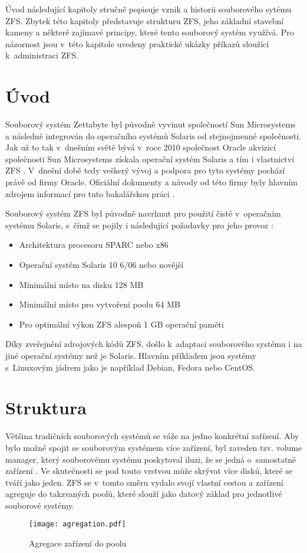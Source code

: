 Úvod následující kapitoly stručně popisuje vznik a historii souborového sytému ZFS. Zbytek této kapitoly představuje strukturu ZFS, jeho základní stavební kameny a některé zajímavé principy, které tento souborový systém využívá. Pro názornost jsou v~této kapitole uvedeny praktické ukázky příkazů sloužící k~administraci ZFS.

\section{Úvod}
    Souborový systém Zettabyte byl původně vyvinut společností Sun Microsystems a následně integrován do operačního systémů Solaris od stejnojmenné společnosti.
    Jak už to tak v~dnešním světě bývá v~roce 2010 společnost Oracle akvizicí společnosti Sun Microsystems získala operační systém Solaris a tím i vlastnictví ZFS \cite{suns}. V~dnešní době tedy veškerý vývoj a podpora pro tyto systémy pochází právě od firmy Oracle. Oficiální dokumenty a návody od této firmy byly hlavním zdrojem informací pro tuto bakalářskou práci \cite{guide}.

    Souborový systém ZFS byl původně navrhnut pro použití čistě v~operačním systému Solaris, s~čímž se pojily i následující požadavky pro jeho provoz \cite{requirements}:
    \begin{itemize}
      \item Architektura procesoru SPARC nebo x86
      \item Operační systém Solaris 10 6/06 nebo novější
      \item Minimální místo na disku 128 MB
      \item Minimální místo pro vytvoření poolu 64 MB
      \item Pro optimální výkon ZFS alespoň 1 GB operační paměti
    \end{itemize}

    Díky zveřejnění zdrojových kódů ZFS, došlo k~adaptaci souborového systému i na jiné operační systémy než je Solaris. Hlavním příkladem jsou systémy s~Linuxovým jádrem jako je například Debian, Fedora nebo CentOS.

\section{Struktura}
Většina tradičních souborových systémů se váže na jedno konkrétní zařízení. Aby bylo možné spojit se souborovým systémem více zařízení, byl zaveden tzv. volume manager, který souborovému systému poskytoval iluzi, že se jedná o~samostatné zařízení \cite{traditional}. Ve skutečnosti se pod touto vrstvou může skrývat více disků, které se tváří jako jeden. ZFS se v~tomto směru vydalo svojí vlastní cestou a zařízení agreguje do takzvaných poolů, které slouží jako datový základ pro jednotlivé souborové systémy.
\begin{figure}
    \centering
    \texttt{[image: agregation.pdf]}
    \caption{Agregace zařízení do poolu}
    \label{agregation}
\end{figure}
